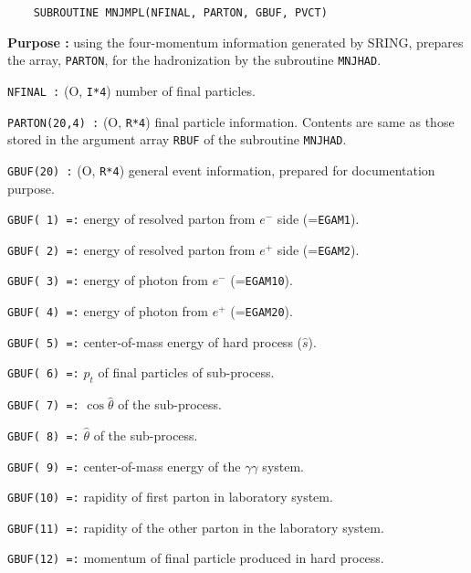 \newlength{\MNJMPL}
\settowidth{\MNJMPL}{\tt SUBROUTINE MNJMPL(NFINAL, PARTON, GBUF, PVCT)}
\begin{verbatim}
    SUBROUTINE MNJMPL(NFINAL, PARTON, GBUF, PVCT)
\end{verbatim}
\vspace{-28pt}
\hspace*{4ex}\fbox{\rule[14pt]{\MNJMPL}{0cm}}
\begin{list}{ }{\parsep=0pt \itemsep=0pt \topsep=0pt }
\item[\bf Purpose :] using the four-momentum information generated by
SRING, prepares the array, {\tt PARTON}, for the hadronization 
by the subroutine {\tt MNJHAD}.
\item[\tt NFINAL :] (O, {\tt I*4}) number of final particles.
\item[\tt PARTON(20,4) :] (O, {\tt R*4}) final particle information.
Contents are same as those stored in the argument array {\tt RBUF} of the 
subroutine {\tt MNJHAD}.
\item[\tt GBUF(20) :] (O, {\tt R*4}) general event information,
prepared for documentation purpose.
  \begin{list}{ }{\parsep=0pt \itemsep=0pt \topsep=0pt }
  \item[\tt GBUF( 1) =:] energy of resolved parton from $e^-$ side 
(={\tt EGAM1}).
  \item[\tt GBUF( 2) =:] energy of resolved parton from $e^+$ side 
(={\tt EGAM2}).
  \item[\tt GBUF( 3) =:] energy of photon from $e^-$ (={\tt EGAM10}).
  \item[\tt GBUF( 4) =:] energy of photon from $e^+$ (={\tt EGAM20}).
  \item[\tt GBUF( 5) =:] center-of-mass energy of hard process
($\hat{s}$).
  \item[\tt GBUF( 6) =:] $p_t$ of final particles of sub-process.
  \item[\tt GBUF( 7) =:] $\cos\hat{\theta}$ of the sub-process.
  \item[\tt GBUF( 8) =:] $\hat{\theta}$ of the sub-process.
  \item[\tt GBUF( 9) =:] center-of-mass energy of the $\gamma\gamma$ system.
  \item[\tt GBUF(10) =:] rapidity of first parton in laboratory system.
  \item[\tt GBUF(11) =:] rapidity of the other parton in the
laboratory system.
  \item[\tt GBUF(12) =:] momentum of final particle produced in hard process.

\end{list}
\end{list}
